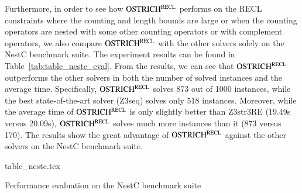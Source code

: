 Furthermore, in order to see how $\rm OSTRICH^{RECL}$ performs on the RECL constraints where the counting and length bounds are large or when the counting operators are nested with some other counting operators or with complement operators, we also compare $\rm OSTRICH^{RECL}$ with the other solvers solely on the NestC benchmark suite. The experiment results can be found in Table~\ref{tab:table_nestc_eval}. From the results, we can see that $\rm OSTRICH^{RECL}$ outperforms the other solvers in both the number of solved instances and the average time. Specifically, $\rm OSTRICH^{RECL}$ solves 873 out of 1000 instances, while the best state-of-the-art solver (Z3seq) solves only 518 instances. Moreover, while the average time of $\rm OSTRICH^{RECL}$ is only slightly better than Z3str3RE (19.49s versus 20.09s), $\rm OSTRICH^{RECL}$ solves much more instances than it (873 versus 170). The results show the great advantage of $\rm OSTRICH^{RECL}$ against the other solvers on the NestC benchmark suite. 

\begin{table}[htbp]
  \centering\vskip 0pt
    {table_nestc.tex}
    \caption{Performance evaluation on the NestC benchmark suite}
  \label{tab:table_nestc_eval}
\end{table}




